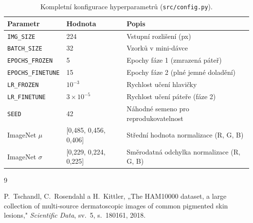 \documentclass[12pt, a4paper]{article}
\begin{document}
\begin{table}[H]
    \centering
    \caption{Kompletní konfigurace hyperparametrů (\texttt{src/config.py}).}
    \begin{tabular}{llp{6.5cm}}
        \toprule
        \textbf{Parametr} & \textbf{Hodnota} & \textbf{Popis} \\
        \midrule
        \texttt{IMG\_SIZE}        & 224       & Vstupní rozlišení (px) \\
        \texttt{BATCH\_SIZE}      & 32        & Vzorků v mini-dávce \\
        \texttt{EPOCHS\_FROZEN}   & 5         & Epochy fáze 1 (zmrazená páteř) \\
        \texttt{EPOCHS\_FINETUNE} & 15        & Epochy fáze 2 (plné jemné doladění) \\
        \texttt{LR\_FROZEN}       & $10^{-3}$ & Rychlost učení hlavičky \\
        \texttt{LR\_FINETUNE}     & $3\times10^{-5}$ & Rychlost učení páteře (fáze 2) \\
        \texttt{SEED}             & 42        & Náhodné semeno pro reprodukovatelnost \\
        ImageNet $\mu$            & [0{,}485, 0{,}456, 0{,}406] & Střední hodnota normalizace (R, G, B) \\
        ImageNet $\sigma$         & [0{,}229, 0{,}224, 0{,}225] & Směrodatná odchylka normalizace (R, G, B) \\
        \bottomrule
    \end{tabular}
    \label{tab:hyperparams}
\end{table}


\begin{thebibliography}{9}

P.~Tschandl, C.~Rosendahl a H.~Kittler,
„The HAM10000 dataset, a large collection of multi-source dermatoscopic images
  of common pigmented skin lesions,"
\textit{Scientific Data}, sv.~5, s.~180161, 2018.

\end{thebibliography}
\end{document}

